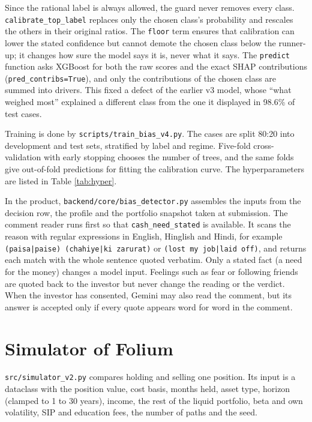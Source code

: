 Since the rational label is always allowed, the guard never removes every class. \texttt{calibrate\_top\_label} replaces only the chosen class's probability and rescales the others in their original ratios. The \texttt{floor} term ensures that calibration can lower the stated confidence but cannot demote the chosen class below the runner-up; it changes how sure the model says it is, never what it says. The \texttt{predict} function asks XGBoost for both the raw scores and the exact SHAP contributions (\texttt{pred\_contribs=True}), and only the contributions of the chosen class are summed into drivers. This fixed a defect of the earlier v3 model, whose ``what weighed most'' explained a different class from the one it displayed in 98.6\% of test cases.

Training is done by \texttt{scripts/train\_bias\_v4.py}. The cases are split 80:20 into development and test sets, stratified by label and regime. Five-fold cross-validation with early stopping chooses the number of trees, and the same folds give out-of-fold predictions for fitting the calibration curve. The hyperparameters are listed in Table \ref{tab:hyper}.

In the product, \texttt{backend/core/bias\_detector.py} assembles the inputs from the decision row, the profile and the portfolio snapshot taken at submission. The comment reader runs first so that \texttt{cash\_need\_stated} is available. It scans the reason with regular expressions in English, Hinglish and Hindi, for example \texttt{(paisa|paise) (chahiye|ki zarurat)} or \texttt{(lost my job|laid off)}, and returns each match with the whole sentence quoted verbatim. Only a stated fact (a need for the money) changes a model input. Feelings such as fear or following friends are quoted back to the investor but never change the reading or the verdict. When the investor has consented, Gemini may also read the comment, but its answer is accepted only if every quote appears word for word in the comment.

\section{Simulator of Folium}
\texttt{src/simulator\_v2.py} compares holding and selling one position. Its input is a dataclass with the position value, cost basis, months held, asset type, horizon (clamped to 1 to 30 years), income, the rest of the liquid portfolio, beta and own volatility, SIP and education fees, the number of paths and the seed.

